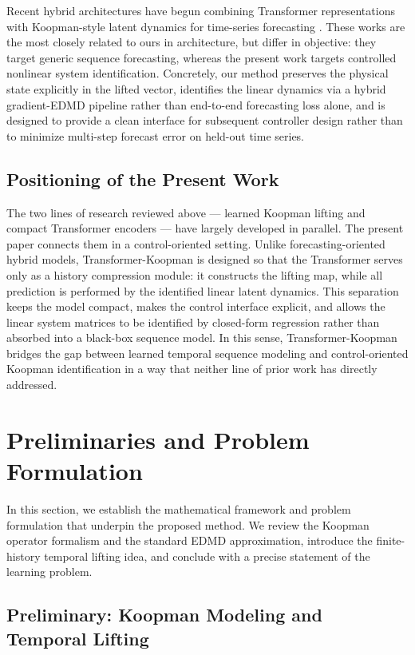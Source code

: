\documentclass[journal]{IEEEtran}
\begin{document}
Recent hybrid architectures have begun combining Transformer representations with Koopman-style latent dynamics for time-series forecasting \cite{forootani2026deepkoopformer, forootani2026spectral}. These works are the most closely related to ours in architecture, but differ in objective: they target generic sequence forecasting, whereas the present work targets controlled nonlinear system identification. Concretely, our method preserves the physical state explicitly in the lifted vector, identifies the linear dynamics via a hybrid gradient-EDMD pipeline rather than end-to-end forecasting loss alone, and is designed to provide a clean interface for subsequent controller design rather than to minimize multi-step forecast error on held-out time series.

\subsection{Positioning of the Present Work}

The two lines of research reviewed above --- learned Koopman lifting and compact Transformer encoders --- have largely developed in parallel. The present paper connects them in a control-oriented setting. Unlike forecasting-oriented hybrid models, Transformer-Koopman is designed so that the Transformer serves only as a history compression module: it constructs the lifting map, while all prediction is performed by the identified linear latent dynamics. This separation keeps the model compact, makes the control interface explicit, and allows the linear system matrices to be identified by closed-form regression rather than absorbed into a black-box sequence model. In this sense, Transformer-Koopman bridges the gap between learned temporal sequence modeling and control-oriented Koopman identification in a way that neither line of prior work has directly addressed.

\section{Preliminaries and Problem Formulation}
\label{sec:preliminaries_and_problem}

In this section, we establish the mathematical framework and problem formulation that underpin the proposed method. We review the Koopman operator formalism and the standard EDMD approximation, introduce the finite-history temporal lifting idea, and conclude with a precise statement of the learning problem.

\subsection{Preliminary: Koopman Modeling and Temporal Lifting}
\label{sec:preliminary}
\end{document}
